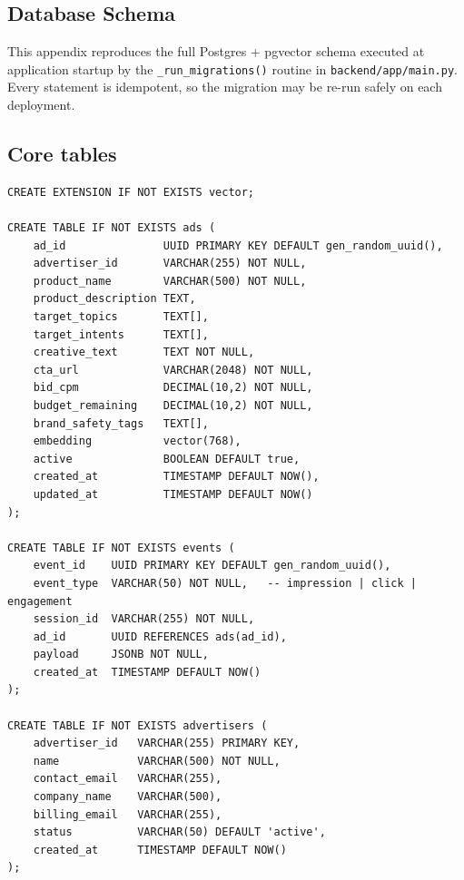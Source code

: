 \begin{appendices}

\section{Database Schema}
\label{app:schema}

This appendix reproduces the full Postgres + pgvector schema executed
at application startup by the \texttt{\_run\_migrations()} routine in
\texttt{backend/app/main.py}. Every statement is idempotent, so the
migration may be re-run safely on each deployment.

\subsection*{Core tables}

\begin{lstlisting}[style=sqlstyle, caption={Core table definitions.}]
CREATE EXTENSION IF NOT EXISTS vector;

CREATE TABLE IF NOT EXISTS ads (
    ad_id               UUID PRIMARY KEY DEFAULT gen_random_uuid(),
    advertiser_id       VARCHAR(255) NOT NULL,
    product_name        VARCHAR(500) NOT NULL,
    product_description TEXT,
    target_topics       TEXT[],
    target_intents      TEXT[],
    creative_text       TEXT NOT NULL,
    cta_url             VARCHAR(2048) NOT NULL,
    bid_cpm             DECIMAL(10,2) NOT NULL,
    budget_remaining    DECIMAL(10,2) NOT NULL,
    brand_safety_tags   TEXT[],
    embedding           vector(768),
    active              BOOLEAN DEFAULT true,
    created_at          TIMESTAMP DEFAULT NOW(),
    updated_at          TIMESTAMP DEFAULT NOW()
);

CREATE TABLE IF NOT EXISTS events (
    event_id    UUID PRIMARY KEY DEFAULT gen_random_uuid(),
    event_type  VARCHAR(50) NOT NULL,   -- impression | click | engagement
    session_id  VARCHAR(255) NOT NULL,
    ad_id       UUID REFERENCES ads(ad_id),
    payload     JSONB NOT NULL,
    created_at  TIMESTAMP DEFAULT NOW()
);

CREATE TABLE IF NOT EXISTS advertisers (
    advertiser_id   VARCHAR(255) PRIMARY KEY,
    name            VARCHAR(500) NOT NULL,
    contact_email   VARCHAR(255),
    company_name    VARCHAR(500),
    billing_email   VARCHAR(255),
    status          VARCHAR(50) DEFAULT 'active',
    created_at      TIMESTAMP DEFAULT NOW()
);
\end{lstlisting}


\end{appendices}
